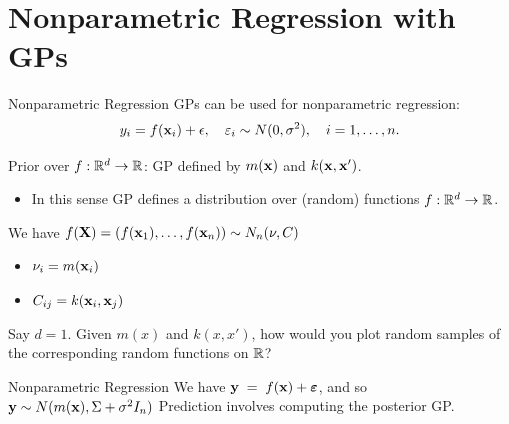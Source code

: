 \documentclass[11pt,handout,aspectratio=169]{beamer}
\begin{document}
\section{Nonparametric Regression with GPs}

\begin{frame}{Nonparametric Regression}
GPs can be used for nonparametric regression:
    \[
    y_i = f(\mathbf{x}_i) + \epsilon, \quad \varepsilon_i \sim {N}(0, \sigma^2),\quad i=1,\ldots, n.
    \]
    
Prior over \( f:\mathbb R^d\to \mathbb R \): GP defined by \( m(\mathbf{x}) \) and \( k(\mathbf{x}, \mathbf{x}') \).
    \begin{itemize}
    \item In this sense GP defines a distribution over (random) functions $f: \mathbb R^d\to \mathbb R$.
    \end{itemize}    
    \medskip 
    
We have $f(\mathbf{X})=(f(\mathbf{x}_1),\ldots,f(\mathbf{x}_n))\sim N_n(\nu,C)$ 
    \begin{itemize}
    \item $\nu_i=m(\mathbf{x}_i)$
    \item $C_{ij}=k(\mathbf{x}_i,\mathbf{x}_j)$
    \end{itemize}
    
    \begin{alertblock}{}
    	Say $d=1$. Given \( m(x) \) and \( k(x, x') \), how would you plot random samples of the corresponding random functions on $\mathbb R$?
    \end{alertblock}

\end{frame}

\begin{frame}{Nonparametric Regression}
	We have $\mathbf y\;=\;f(\mathbf{x})+\boldsymbol{\varepsilon}$, and so $\mathbf{y}\sim N(m(\mathbf{x}),\Sigma+\sigma^2 I_n)$
   Prediction involves computing the posterior GP.
\end{frame}


%
%
%
%
\end{document}
